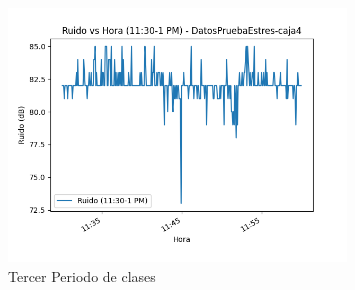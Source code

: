 \documentclass{templateNote}
\begin{document}
\begin{figure}[H]
    \centering
    \includegraphics[width=0.8\textwidth]{img/DatosPruebaEstres-caja4_ruido_11-30_1_pm.png}
    \caption{Tercer Periodo de clases}
\end{figure}
\end{document}
